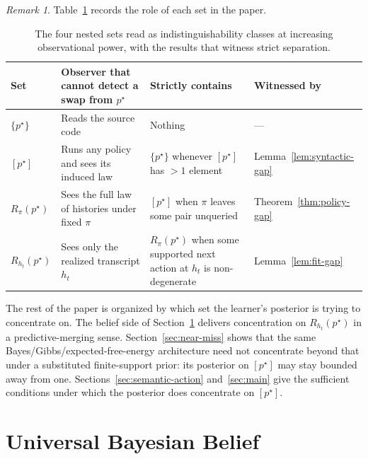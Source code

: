 \documentclass[11pt]{article}
\theoremstyle{definition}
\theoremstyle{remark}
\newtheorem{remark}[theorem]{Remark}
\begin{document}
\begin{remark}
Table~\ref{tab:hierarchy} records the role of each set in the paper.
\end{remark}

\begin{table}[ht]
\centering
\small
\caption{The four nested sets read as indistinguishability classes at increasing observational power, with the results that witness strict separation.}
\label{tab:hierarchy}
\begin{tabularx}{\textwidth}{@{}>{\raggedright\arraybackslash}p{}>{\raggedright\arraybackslash}p{}>{\raggedright\arraybackslash}X>{\raggedright\arraybackslash}p{}@{}}
\toprule
\textbf{Set} & \textbf{Observer that cannot detect a swap from $p^\star$} & \textbf{Strictly contains} & \textbf{Witnessed by} \\
\midrule
$\{p^\star\}$ & Reads the source code & Nothing & --- \\
$[p^\star]$ & Runs any policy and sees its induced law & $\{p^\star\}$ whenever $[p^\star]$ has $>1$ element & Lemma~\ref{lem:syntactic-gap} \\
$R_\pi(p^\star)$ & Sees the full law of histories under fixed $\pi$ & $[p^\star]$ when $\pi$ leaves some pair unqueried & Theorem~\ref{thm:policy-gap} \\
$R_{h_t}(p^\star)$ & Sees only the realized transcript $h_t$ & $R_\pi(p^\star)$ when some supported next action at $h_t$ is non-degenerate & Lemma~\ref{lem:fit-gap} \\
\bottomrule
\end{tabularx}
\end{table}

The rest of the paper is organized by which set the learner's posterior is trying to concentrate on. The belief side of Section~\ref{sec:belief} delivers concentration on $R_{h_t}(p^\star)$ in a predictive-merging sense. Section~\ref{sec:near-miss} shows that the same Bayes/Gibbs/expected-free-energy architecture need not concentrate beyond that under a substituted finite-support prior: its posterior on $[p^\star]$ may stay bounded away from one. Sections~\ref{sec:semantic-action} and~\ref{sec:main} give the sufficient conditions under which the posterior does concentrate on $[p^\star]$.

\section{Universal Bayesian Belief}
\label{sec:belief}
\end{document}
